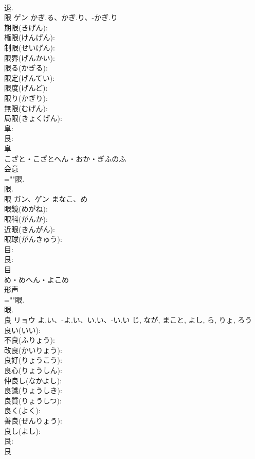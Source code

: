 \documentclass[8pt]{extreport}
\begin{document}
\begin{CJK}{UTF8}{min}
\\	退.
\\	限	ゲン	かぎ.る、かぎ.り、-かぎ.り		
\\	期限(きげん): 
\\	権限(けんげん): 
\\	制限(せいげん): 
\\	限界(げんかい): 
\\	限る(かぎる): 
\\	限定(げんてい): 
\\	限度(げんど): 
\\	限り(かぎり): 
\\	無限(むげん): 
\\	局限(きょくげん): 
\\	阜: 
\\	艮: 
\\	阜	
\\	こざと・こざとへん・おか・ぎふのふ	
\\	会意 
\\	=""限.
\\	限.
\\	眼	ガン、ゲン	まなこ、め		
\\	眼鏡(めがね): 
\\	眼科(がんか): 
\\	近眼(きんがん): 
\\	眼球(がんきゅう): 
\\	目: 
\\	艮: 
\\	目	
\\	め・めへん・よこめ	
\\	形声 
\\	=""眼.
\\	眼.
\\	良	リョウ	よ.い、-よ.い、い.い、-い.い	じ, なが, まこと, よし, ら, りょ, ろう	
\\	良い(いい): 
\\	不良(ふりょう): 
\\	改良(かいりょう): 
\\	良好(りょうこう): 
\\	良心(りょうしん): 
\\	仲良し(なかよし): 
\\	良識(りょうしき): 
\\	良質(りょうしつ): 
\\	良く(よく): 
\\	善良(ぜんりょう): 
\\	良し(よし): 
\\	艮: 
\\	艮	

\end{CJK}
\end{document}
